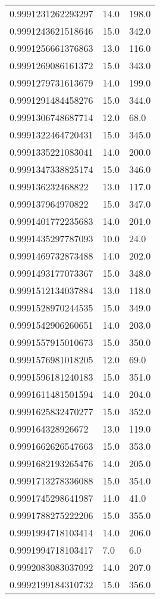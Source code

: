 \begin{center}
\begin{supertabular}[H]{p{0.30\textwidth}p{0.05\textwidth}p{0.05\textwidth}}
0.9991231262293297 & 14.0 & 198.0 \\ 
0.9991243621518646 & 15.0 & 342.0 \\ 
0.9991256661376863 & 13.0 & 116.0 \\ 
0.9991269086161372 & 15.0 & 343.0 \\ 
0.9991279731613679 & 14.0 & 199.0 \\ 
0.9991291484458276 & 15.0 & 344.0 \\ 
0.9991306748687714 & 12.0 & 68.0 \\ 
0.9991322464720431 & 15.0 & 345.0 \\ 
0.9991335221083041 & 14.0 & 200.0 \\ 
0.9991347338825174 & 15.0 & 346.0 \\ 
0.999136232468822 & 13.0 & 117.0 \\ 
0.999137964970822 & 15.0 & 347.0 \\ 
0.9991401772235683 & 14.0 & 201.0 \\ 
0.9991435297787093 & 10.0 & 24.0 \\ 
0.9991469732873488 & 14.0 & 202.0 \\ 
0.9991493177073367 & 15.0 & 348.0 \\ 
0.9991512134037884 & 13.0 & 118.0 \\ 
0.9991528970244535 & 15.0 & 349.0 \\ 
0.9991542906260651 & 14.0 & 203.0 \\ 
0.9991557915010673 & 15.0 & 350.0 \\ 
0.9991576981018205 & 12.0 & 69.0 \\ 
0.9991596181240183 & 15.0 & 351.0 \\ 
0.9991611481501594 & 14.0 & 204.0 \\ 
0.9991625832470277 & 15.0 & 352.0 \\ 
0.999164328926672 & 13.0 & 119.0 \\ 
0.9991662626547663 & 15.0 & 353.0 \\ 
0.9991682193265476 & 14.0 & 205.0 \\ 
0.9991713278336088 & 15.0 & 354.0 \\ 
0.9991745298641987 & 11.0 & 41.0 \\ 
0.9991788275222206 & 15.0 & 355.0 \\ 
0.9991994718103414 & 14.0 & 206.0 \\ 
0.9991994718103417 & 7.0 & 6.0 \\ 
0.9992083083037092 & 14.0 & 207.0 \\ 
0.9992199184310732 & 15.0 & 356.0 \\ 

\end{supertabular}
\end{center}
